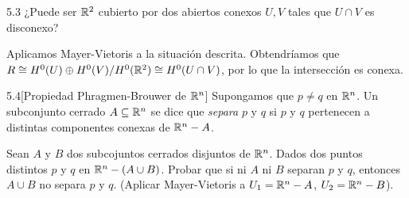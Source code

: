 \documentclass[twoside]{article}
\begin{document}
\begin{ejercicio}{5.3}
¿Puede ser $\mathbb{R}^2$ cubierto por dos abiertos conexos $U,V$ tales que $U\cap V$ es disconexo? 
\end{ejercicio}
\begin{solucion}
Aplicamos Mayer-Vietoris a la situación descrita. Obtendríamos que $R\cong H^0(U)\oplus H^0(V)/H^0(\mathbb{R}^2)\cong H^0(U\cap V)$, por lo que la intersección es conexa.
\end{solucion}
\newpage

\begin{ejercicio}{5.4}[Propiedad Phragmen-Brouwer de $\mathbb{R}^n$]  Supongamos que $p\neq q$ en $\mathbb{R}^n$. Un subconjunto cerrado $A\subseteq\mathbb{R}^n$ se dice que \emph{separa} $p$ y $q$ si $p$ y $q$ pertenecen a distintas componentes conexas de $\mathbb{R}^n-A$. 

Sean $A$ y $B$ dos subcojuntos cerrados disjuntos de $\mathbb{R}^n$. Dados dos puntos distintos $p$ y $q$ en $\mathbb{R}^n-(A\cup B)$. Probar que si ni $A$ ni $B$ separan $p$ y $q$, entonces $A\cup B$ no separa $p$ y $q$. (Aplicar Mayer-Vietoris a $U_1=\mathbb{R}^n-A$, $U_2=\mathbb{R}^n-B$).

\end{ejercicio}
\end{document}
